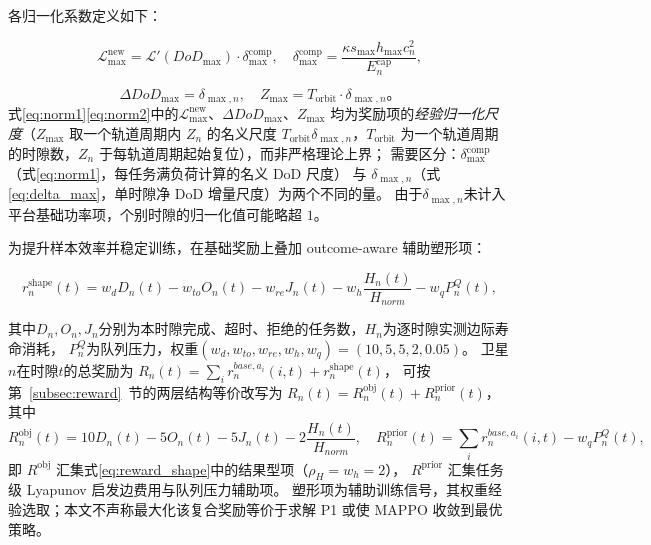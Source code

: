 \documentclass[a4paper,11pt]{article}
\begin{document}
各归一化系数定义如下：

\begin{equation}
\mathcal{L}^{\mathrm{new}}_{\max} =
\mathcal{L}'(DoD_{\max})\cdot\delta^{\mathrm{comp}}_{\max},
\quad
\delta^{\mathrm{comp}}_{\max} = \frac{\kappa s_{\max} h_{\max} c^2_n}{E^{\mathrm{cap}}_n},
\label{eq:norm1}
\end{equation}

\begin{equation}
\Delta DoD_{\max} = \delta_{\max,n},
\quad
Z_{\max} = T_{\mathrm{orbit}}\cdot\delta_{\max,n}。
\label{eq:norm2}
\end{equation}
式\eqref{eq:norm1}\eqref{eq:norm2}中的$\mathcal{L}^{\mathrm{new}}_{\max}$、$\Delta DoD_{\max}$、$Z_{\max}$
均为奖励项的\emph{经验归一化尺度}（$Z_{\max}$ 取一个轨道周期内 $Z_n$ 的名义尺度
$T_{\mathrm{orbit}}\delta_{\max,n}$，$T_{\mathrm{orbit}}$ 为一个轨道周期的时隙数，$Z_n$ 于每轨道周期起始复位），而非严格理论上界；
需要区分：$\delta^{\mathrm{comp}}_{\max}$（式\eqref{eq:norm1}，每任务满负荷计算的名义 DoD 尺度）
与 $\delta_{\max,n}$（式\eqref{eq:delta_max}，单时隙净 DoD 增量尺度）为两个不同的量。
由于$\delta_{\max,n}$未计入平台基础功率项，个别时隙的归一化值可能略超 $1$。

为提升样本效率并稳定训练，在基础奖励上叠加 outcome-aware 辅助塑形项：

\begin{equation}
r^{\mathrm{shape}}_n(t) = w_d D_n(t) - w_{to} O_n(t) - w_{re} J_n(t)
- w_h \frac{H_n(t)}{H_{norm}} - w_q P^{Q}_n(t),
\label{eq:reward_shape}
\end{equation}

其中$D_n, O_n, J_n$分别为本时隙完成、超时、拒绝的任务数，$H_n$为逐时隙实测边际寿命消耗，
$P^Q_n$为队列压力，权重$(w_d, w_{to}, w_{re}, w_h, w_q) = (10, 5, 5, 2, 0.05)$。
卫星$n$在时隙$t$的总奖励为 $R_n(t) = \sum_i r^{base,a_i}_n(i,t) + r^{\mathrm{shape}}_n(t)$，
可按第~\ref{subsec:reward}~节的两层结构等价改写为 $R_n(t)=R^{\mathrm{obj}}_n(t)+R^{\mathrm{prior}}_n(t)$，其中
\begin{equation}
R^{\mathrm{obj}}_n(t) = 10 D_n(t) - 5 O_n(t) - 5 J_n(t) - 2\frac{H_n(t)}{H_{norm}},
\quad
R^{\mathrm{prior}}_n(t) = \sum_i r^{base,a_i}_n(i,t) - w_q P^Q_n(t),
\label{eq:reward_twolayer}
\end{equation}
即 $R^{\mathrm{obj}}$ 汇集式\eqref{eq:reward_shape}中的结果型项（$\rho_H=w_h=2$），
$R^{\mathrm{prior}}$ 汇集任务级 Lyapunov 启发边费用与队列压力辅助项。
塑形项为辅助训练信号，其权重经验选取；本文不声称最大化该复合奖励等价于求解 P1 或使 MAPPO 收敛到最优策略。
\end{document}
